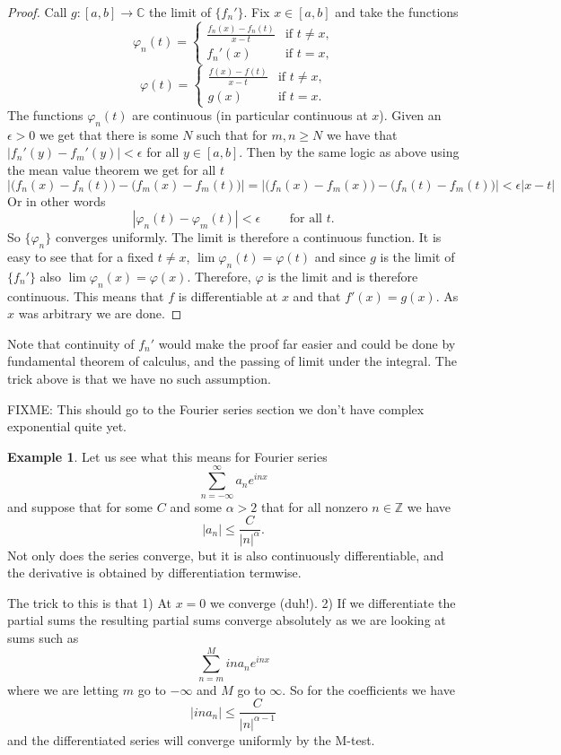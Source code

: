 \documentclass[12pt]{book}
\newcommand{\abs}[1]{\left\lvert {#1} \right\rvert}
\newcommand{\C}{{\mathbb{C}}}
\newcommand{\Z}{{\mathbb{Z}}}
\theoremstyle{plain}
\theoremstyle{remark}
\theoremstyle{definition}
\theoremstyle{exercise}
\theoremstyle{example}
\newtheorem{example}[thm]{Example}
\begin{document}
\begin{proof}
Call $g \colon [a,b] \to \C$ the limit of $\{ f_n' \}$. 
Fix $x \in [a,b]$ and take the functions
$$
\varphi_n(t) =
\begin{cases}
\frac{f_n(x)-f_n(t)}{x-t} & \text{if $t \not= x$,}\\
f_n'(x) & \text{if $t = x$,}
\end{cases}
$$
$$
\varphi(t) =
\begin{cases}
\frac{f(x)-f(t)}{x-t} & \text{if $t \not= x$,}\\
g(x) & \text{if $t = x$.}
\end{cases}
$$
The functions $\varphi_n(t)$ are continuous (in particular continuous at $x$).
Given an $\epsilon > 0$ we get that
there is some $N$ such that for $m,n \geq N$ we have that
$\abs{f_n'(y) - f_m'(y)} < \epsilon$ for all $y \in [a,b]$.
Then by the same logic as above
using the mean value theorem we get for all $t$
\begin{equation*}
\abs{\bigl(f_n(x)-f_n(t)\bigr) - \bigl(f_m(x)-f_m(t)\bigr)} = 
\abs{\bigl(f_n(x)-f_m(x)\bigr) - \bigl(f_n(t)-f_m(t)\bigr)}
<
\epsilon \abs{x-t}
\end{equation*}
Or in other words
$$
\abs{\varphi_n(t) - \varphi_m(t)} < \epsilon \qquad \text{ for all $t$}.
$$
So $\{ \varphi_n \}$ converges uniformly.  The limit is therefore
a continuous function.  It is easy to see that for a fixed $t \not= x$,
$\lim \varphi_n(t) = \varphi(t)$ and since $g$ is the limit of $\{ f_n' \}$
also $\lim \varphi_n(x) = \varphi(x)$.  Therefore, $\varphi$ is the limit
and is therefore continuous.  This means that $f$ is differentiable at $x$
and that $f'(x) = g(x)$.  As $x$ was arbitrary we are done.
\end{proof}

\medskip

Note that continuity of $f_n'$ would make the proof far easier and could be
done by fundamental theorem of calculus, and the passing of limit under the
integral.  The trick above is that we have no
such assumption.

FIXME: This should go to the Fourier series section we don't have complex
exponential quite yet.
\begin{example}
Let us see what this means for Fourier series
$$
\sum_{n=-\infty}^\infty
a_n e^{inx}
$$
and suppose that for some $C$ and some $\alpha > 2$ that for all nonzero $n \in \Z$ we have
$$
\abs{a_n} \leq \frac{C}{\abs{n}^\alpha} .
$$
Not only does the series converge, but it is also
continuously differentiable, and the derivative is obtained by 
differentiation termwise.

The trick to this is that 1) At $x=0$ we converge (duh!).  2) If we
differentiate the partial sums the resulting partial sums converge
absolutely as we are looking at sums such as
$$
\sum_{n=m}^{M}
i n a_n e^{inx}
$$
where we are letting $m$ go to $-\infty$ and $M$ go to $\infty$.
So for the coefficients we have $$\abs{ina_n} \leq \frac{C}{\abs{n}^{\alpha-1}}$$ and
the differentiated series will converge uniformly by the M-test.
\end{example}
\end{document}
